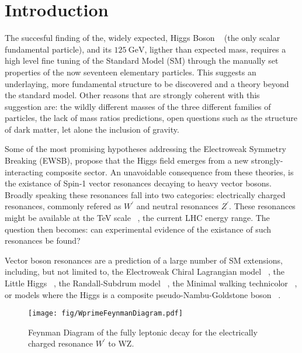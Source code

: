 \section{Introduction}

The succesful finding of the, widely expected, Higgs Boson ~\cite{higgsPaperCMS,higgsPaperATLAS}
(the only scalar fundamental particle), and its $125~\mathrm{GeV}$, ligther than expected mass,
requires a high level fine tuning of the Standard Model (SM) through the
manually set properties of the now seventeen elementary particles.
This suggests an underlaying, more fundamental structure to be discovered and
a theory beyond the standard model. Other
reasons that are strongly coherent with this suggestion are: the wildly
different masses of the three different families of particles, the lack of
mass ratios predictions, open questions such as the structure of dark matter,
let alone the inclusion of gravity.

Some of the most promising hypotheses addressing the Electroweak Symmetry
Breaking (EWSB), propose that the Higgs field
emerges from a new strongly-interacting composite sector. An unavoidable
consequence from these theories, is the existance of Spin-1 vector resonances
decaying to heavy vector bosons.  Broadly speaking these resonances
fall into  two categories: electrically
charged resonances, commonly refered as $W^{\prime}$ and
neutral resonances $Z^{\prime}$. These resonances might be available at the TeV
scale ~\cite{tevscale2014}, the current LHC energy range. The question then becomes:
can experimental evidence of the existance of such resonances be found?

Vector boson resonances are a prediction of a large number
of SM extensions, including, but not limited to, the Electroweak Chiral
Lagrangian model ~\cite{echl2017}, the Little Higgs
~\cite{littlehiggs2007}, the Randall-Subdrum  model ~\cite{randall1999}, the
Minimal walking technicolor ~\cite{technicolor2007}, or models where the Higgs
is a composite pseudo-Nambu-Goldstone boson ~\cite{composite2016}.

\begin{figure}[tph]
  \centering
  \texttt{[image: fig/WprimeFeynmanDiagram.pdf]}
  \caption{ Feynman Diagram of the fully leptonic decay for the
    electrically charged resonance $W^{\prime}$ to WZ.}
  \label{fig:Wprime_FeynmanDiagram}
\end{figure}

